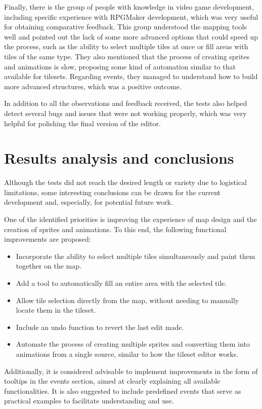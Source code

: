 \medskip

Finally, there is the group of people with knowledge in video game development, including specific experience with RPGMaker development, which was very useful for obtaining comparative feedback. This group understood the mapping tools well and pointed out the lack of some more advanced options that could speed up the process, such as the ability to select multiple tiles at once or fill areas with tiles of the same type. They also mentioned that the process of creating sprites and animations is slow, proposing some kind of automation similar to that available for tilesets. Regarding events, they managed to understand how to build more advanced structures, which was a positive outcome.

\medskip

In addition to all the observations and feedback received, the tests also helped detect several bugs and issues that were not working properly, which was very helpful for polishing the final version of the editor.

\section*{Results analysis and conclusions}
Although the tests did not reach the desired length or variety due to logistical limitations, some interesting conclusions can be drawn for the current development and, especially, for potential future work.

\smallskip

One of the identified priorities is improving the experience of map design and the creation of sprites and animations. To this end, the following functional improvements are proposed:

\begin{itemize}
	\item Incorporate the ability to select multiple tiles simultaneously and paint them together on the map.
	\item Add a tool to automatically fill an entire area with the selected tile.
	\item Allow tile selection directly from the map, without needing to manually locate them in the tileset.
	\item Include an undo function to revert the last edit made.
	\item Automate the process of creating multiple sprites and converting them into animations from a single source, similar to how the tileset editor works.
\end{itemize}

Additionally, it is considered advisable to implement improvements in the form of tooltips in the events section, aimed at clearly explaining all available functionalities. It is also suggested to include predefined events that serve as practical examples to facilitate understanding and use.
